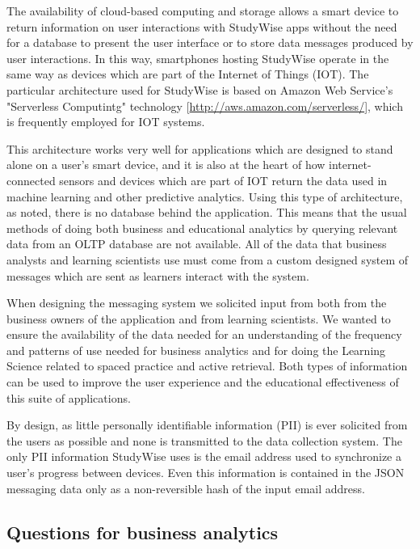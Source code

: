 \documentclass[runningheads,a4paper]{llncs}
\begin{document}
The availability of cloud-based computing and storage allows a smart device to return information on user interactions with StudyWise apps without the need for a database to present the user interface or to store data messages produced by user interactions.  In this way, smartphones hosting StudyWise operate in the same way as devices which are part of the Internet of Things (IOT).  The particular architecture used for StudyWise is based on Amazon Web Service's "Serverless Computintg" technology [\url{http://aws.amazon.com/serverless/}], which is frequently employed for IOT systems. 

This architecture works very well for applications which are designed to stand alone on a user's smart device, and it is also at the heart of how internet-connected sensors and devices which are part of IOT return the data used in machine learning and other predictive analytics.  Using this type of architecture, as noted, there is no database behind the application.  This means that the usual methods of doing both business and educational analytics by querying relevant data from an OLTP database are not available.  All of the data that business analysts and learning scientists use must come from a custom designed system of messages which are sent as learners interact with the system.  

When designing the messaging system we solicited input from both  from the business owners of the application and from  learning scientists.  We wanted to ensure the availability of the data needed for an understanding of the frequency and patterns of use needed for business analytics and for doing the Learning Science related to spaced practice and active retrieval.  Both types of information can be used to improve the user experience and the educational effectiveness of this suite of applications.  

By design, as little personally identifiable information (PII) is ever solicited from the users as possible and none is transmitted to the data collection system.  The only PII information StudyWise uses is the email address used to synchronize a user's progress between devices.  Even this information is contained in the JSON messaging data only as a non-reversible hash of the input email address.

\subsection{Questions for business analytics}
\end{document}
